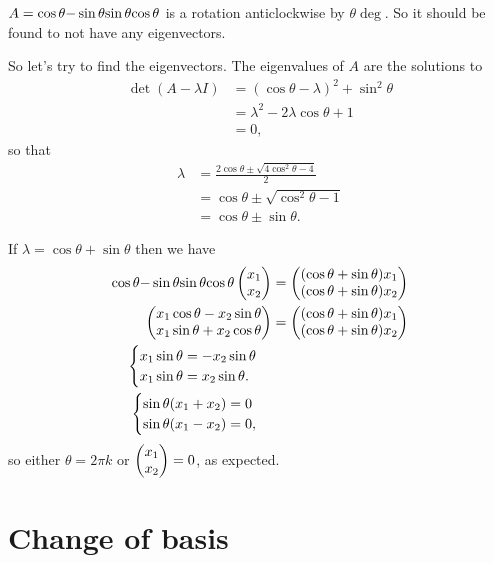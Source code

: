 \begin{example*}
  $A = \mathbf {\cos \theta}{-\sin \theta} {\sin \theta}{\cos \theta}$ is a rotation anticlockwise by
  $\theta \deg$. So it should be found to not have any eigenvectors.

  So let's try to find the eigenvectors. The eigenvalues of $A$ are the solutions to
  \begin{align*}
    \det (A - \lambda I)
    &= (\cos\theta - \lambda)^2 + \sin^2\theta \\
    &= \lambda^2 - 2\lambda\cos\theta + 1 \\
    &= 0,
  \end{align*}
  so that
  \begin{align*}
    \lambda
    &= \frac{2\cos\theta \pm \sqrt{4\cos^2\theta - 4}}{2} \\
    &= \cos\theta \pm \sqrt{\cos^2\theta - 1} \\
    &= \cos\theta \pm \sin\theta.
  \end{align*}

  If $\lambda = \cos\theta + \sin\theta$ then we have
  \begin{align*}
    \mathbf
    {\cos \theta}{-\sin \theta}
    {\sin \theta}{\cos \theta} \begin{pmatrix}x_1\\x_2\end{pmatrix}
    &= \begin{pmatrix}(\cos\theta + \sin\theta)x_1\\(\cos\theta + \sin\theta)x_2\end{pmatrix} \\
    \begin{pmatrix}x_1\cos\theta - x_2\sin\theta\\x_1\sin\theta + x_2\cos\theta\end{pmatrix}
    &= \begin{pmatrix}(\cos\theta + \sin\theta)x_1\\(\cos\theta + \sin\theta)x_2\end{pmatrix} \\
    \begin{cases}
      x_1\sin\theta = -x_2\sin\theta \\
      x_1\sin\theta = x_2\sin\theta.
    \end{cases} \\
    \begin{cases}
      \sin\theta(x_1 + x_2) = 0 \\
      \sin\theta(x_1 - x_2) = 0,
    \end{cases}
  \end{align*}
  so either $\theta = 2\pi k$ or $\begin{pmatrix}x_1\\x_2\end{pmatrix} = 0$, as expected.

\end{example*}



\section{Change of basis}

